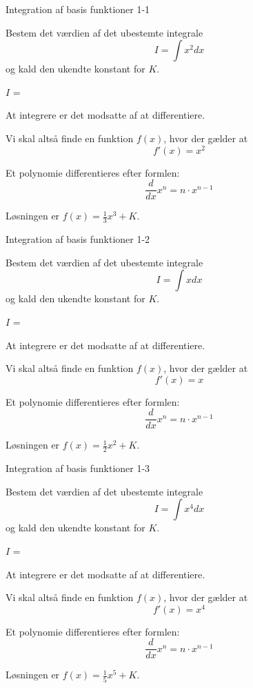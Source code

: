 \documentclass{article}
\begin{document}

\tableofcontents

\begin{exercise}{Integration af basis funktioner 1-1}

Bestem det værdien af det ubestemte integrale
\[
I = \int x^2 dx
\]
og kald den ukendte konstant for $K$.

$I$ =  

\hint
At integrere er det modsatte af at differentiere.

\hint
Vi skal altså finde en funktion $f(x)$, hvor der gælder at
\[
f'(x) = x^2
\]

\hint
Et polynomie differentieres efter formlen:
\[
\frac{d}{dx} x^n = n \cdot x^{n - 1}
\]

\hint
Løsningen er $f(x) = \frac{1}{3} x^3 + K$.

\end{exercise}


\begin{exercise}{Integration af basis funktioner 1-2}

Bestem det værdien af det ubestemte integrale
\[
I = \int x dx
\]
og kald den ukendte konstant for $K$.

$I$ =  

\hint
At integrere er det modsatte af at differentiere.

\hint
Vi skal altså finde en funktion $f(x)$, hvor der gælder at
\[
f'(x) = x
\]

\hint
Et polynomie differentieres efter formlen:
\[
\frac{d}{dx} x^n = n \cdot x^{n - 1}
\]

\hint
Løsningen er $f(x) = \frac{1}{2} x^2 + K$.

\end{exercise}


\begin{exercise}{Integration af basis funktioner 1-3}

Bestem det værdien af det ubestemte integrale
\[
I = \int x^4 dx
\]
og kald den ukendte konstant for $K$.

$I$ =  

\hint
At integrere er det modsatte af at differentiere.

\hint
Vi skal altså finde en funktion $f(x)$, hvor der gælder at
\[
f'(x) = x^4
\]

\hint
Et polynomie differentieres efter formlen:
\[
\frac{d}{dx} x^n = n \cdot x^{n - 1}
\]

\hint
Løsningen er $f(x) = \frac{1}{5} x^5 + K$.

\end{exercise}
\end{document}
